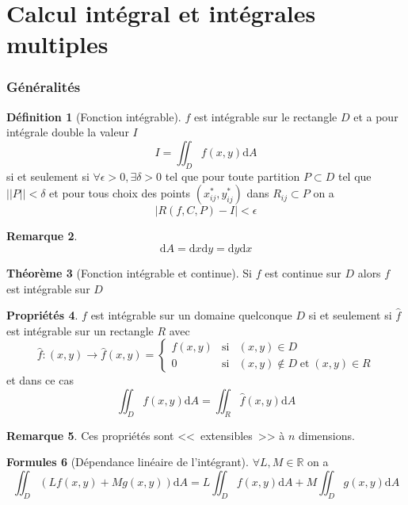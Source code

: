 \documentclass[11pt,a4paper]{article}
\theoremstyle{definition}
\newtheorem{mydef}{Définition}[section]
\newtheorem{myprop}[mydef]{Propriétés}
\newtheorem{myrem}[mydef]{Remarque}
\newtheorem{myform}[mydef]{Formules}
\newtheorem{mytheo}[mydef]{Théorème}
\newcommand{\R}{\mathbb{R}}
\newcommand{\dif}{\mathrm{d}}
\newcommand{\fl}{\rightarrow}
\begin{document}

\part{Calcul intégral et intégrales multiples}

\section{Généralités}

\begin{mydef}[Fonction intégrable] $f$ est intégrable sur le rectangle $D$ et a pour intégrale double la valeur $I$
\[ I = \iint_D f(x,y) \dif A \]
si et seulement si $\forall \epsilon > 0, \exists \delta > 0$ tel que pour toute partition $P \subset D$ tel que $||P|| < \delta$ et pour tous choix des points $(x_{ij}^{*},y_{ij}^{*})$ dans $R_{ij} \subset P$ on a
\[ |R(f,C,P) - I| < \epsilon \]
\end{mydef}

\begin{myrem}
\[ \dif A = \dif x \dif y = \dif y \dif x \]
\end{myrem}

\begin{mytheo}[Fonction intégrable et continue]
Si $f$ est continue sur $D$ alors $f$ est intégrable sur $D$
\end{mytheo}

\begin{myprop} $f$ est intégrable sur un domaine quelconque $D$ si et seulement si $\hat{f}$ est intégrable sur un rectangle $R$ avec
\[ \hat{f} : (x,y) \fl \hat{f}(x,y) = \left\{ \begin{array}{lll} f(x,y) & \text{si} & (x,y) \in D \\ 0 & \text{si} & (x,y) \notin D  \; \text{et} \; (x,y) \in R \end{array} \right. \]
et dans ce cas
\[ \iint_D f(x,y) \dif A = \iint_R \hat{f}(x,y) \dif A \]
\end{myprop}

\begin{myrem} Ces propriétés sont <<~extensibles~>> à $n$ dimensions. \end{myrem}

\begin{myform}[Dépendance linéaire de l'intégrant] $\forall L, M \in \R$ on a
\[ \iint_D (L f(x,y) + M g(x,y)) \dif A = L \iint_D f(x,y) \dif A + M \iint_D g(x,y) \dif A \]
\end{myform}
\end{document}
